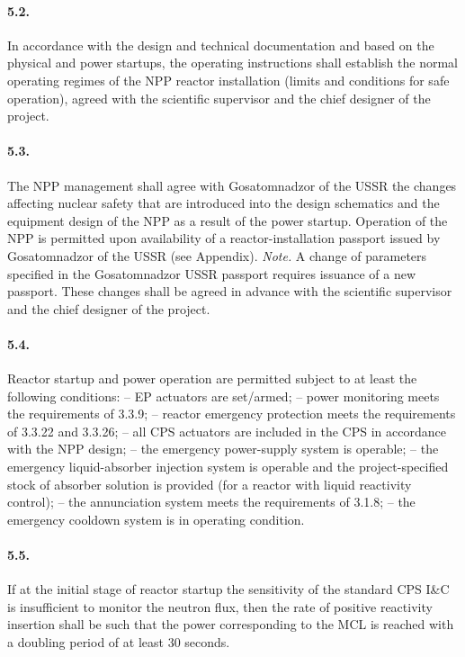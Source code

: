 \documentclass[openright]{bookest}
\begin{document}
\paragraph{5.2.} In accordance with the design and technical documentation and based on the physical and power startups, the operating instructions shall establish the normal operating regimes of the NPP reactor installation (limits and conditions for safe operation), agreed with the scientific supervisor and the chief designer of the project.

\paragraph{5.3.} The NPP management shall agree with Gosatomnadzor of the USSR the changes affecting nuclear safety that are introduced into the design schematics and the equipment design of the NPP as a result of the power startup. Operation of the NPP is permitted upon availability of a reactor-installation passport issued by Gosatomnadzor of the USSR (see Appendix).
\emph{Note.} A change of parameters specified in the Gosatomnadzor USSR passport requires issuance of a new passport. These changes shall be agreed in advance with the scientific supervisor and the chief designer of the project.

\paragraph{5.4.} Reactor startup and power operation are permitted subject to at least the following conditions:
-- EP actuators are set/armed;
-- power monitoring meets the requirements of 3.3.9;
-- reactor emergency protection meets the requirements of 3.3.22 and 3.3.26;
-- all CPS actuators are included in the CPS in accordance with the NPP design;
-- the emergency power-supply system is operable;
-- the emergency liquid-absorber injection system is operable and the project-specified stock of absorber solution is provided (for a reactor with liquid reactivity control);
-- the annunciation system meets the requirements of 3.1.8;
-- the emergency cooldown system is in operating condition.

\paragraph{5.5.} If at the initial stage of reactor startup the sensitivity of the standard CPS I\&C is insufficient to monitor the neutron flux, then the rate of positive reactivity insertion shall be such that the power corresponding to the MCL is reached with a doubling period of at least \num{30} seconds.
\end{document}
